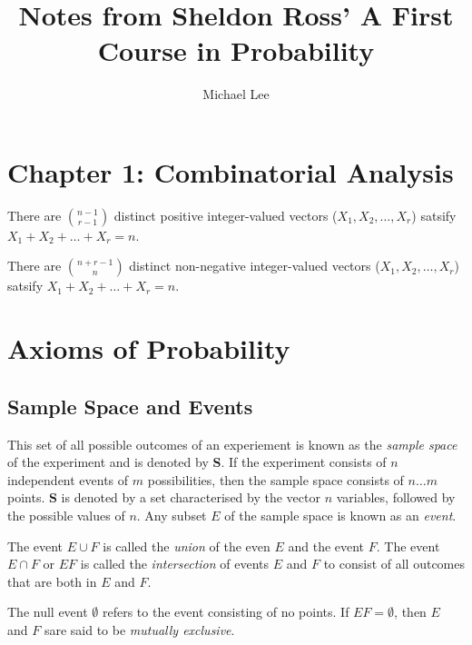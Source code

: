 \documentclass[11pt]{article} %
\title{Notes from Sheldon Ross' A First Course in Probability}
\author{Michael Lee}
\newenvironment{definition}[1][Definition]{\begin{trivlist}
\item[\hskip \labelsep {\bfseries #1}]}{\end{trivlist}}
\newenvironment{formula}[1][Formula]{\begin{trivlist}
\item[\hskip \labelsep {\bfseries #1}]}{\end{trivlist}}
\begin{document}
\maketitle


\section{Chapter 1: Combinatorial Analysis}

\begin{formula}
	There are ${ {n - 1} \choose {r - 1}}$ distinct positive integer-valued vectors ($X_1, X_2, \ldots, X_r$) satsify $X_1 + X_2 + \ldots + X_r = n$.   
\end{formula}

\begin{formula}
		There are ${ {n + r - 1} \choose {n}}$ distinct non-negative integer-valued vectors ($X_1, X_2, \ldots, X_r$) satsify $X_1 + X_2 + \ldots + X_r = n$.   
\end{formula}

\section{Axioms of Probability}

\subsection{Sample Space and Events}

\begin{definition}
	This set of all possible outcomes of an experiement is known as the {\it sample space} of the experiment and is denoted by {\bf S}. If the experiment consists of $n$ independent events of $m$ possibilities, then the sample space consists of $n \ldots m$ points. {\bf S} is denoted by a set characterised by the vector $n$ variables, followed by the possible values of $n$. Any subset $E$ of the sample space is known as an {\it event}.
\end{definition}

\begin{definition}
	The event ${E \cup F}$ is called the {\it union} of the even $E$ and the event $F$. The event ${E \cap F}$ or ${EF}$ is called the {\it intersection} of events $E$ and $F$ to consist of all outcomes that are both in $E$ and $F$. 
\end{definition}

\begin{definition}
	The null event $\emptyset$ refers to the event consisting of no points. If $EF = \emptyset$, then $E$ and $F$ sare said to be {\it mutually exclusive}. 
\end{definition}
\end{document}
